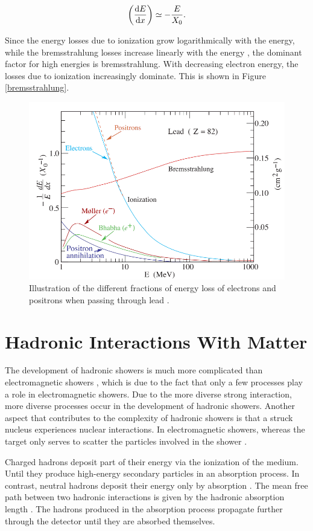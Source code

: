 \documentclass[12pt, a4paper]{thesis}
\begin{document}
\begin{align}
\left( \dv{E}{x} \right) \simeq - \frac{E}{X_0}.
\end{align}

Since the energy losses due to ionization grow logarithmically with
the energy, while the bremsstrahlung losses increase linearly with the
energy \cite{PhysRevD.98.030001}, the dominant factor for high
energies is bremsstrahlung. With decreasing electron energy, the
losses due to ionization increasingly dominate. This is shown in
Figure \ref{bremsstrahlung}.

\begin{figure}[htbp]
\centering
\includegraphics[width=0.8 \textwidth]{../images/bremsstrahlung.png}
\caption{\label{fig:org38d2e17}
Illustration of the different fractions of energy loss of electrons and positrons when passing through lead \cite{PhysRevD.98.030001}.}
\end{figure}

\section{Hadronic Interactions With Matter}
\label{sec:org39e1a53}

The development of hadronic showers is much more complicated than
electromagnetic showers \cite{wigman18}, which is due to the fact that
only a few processes play a role in electromagnetic showers.  Due to
the more diverse strong interaction, more diverse processes occur in
the development of hadronic showers. Another aspect that contributes
to the complexity of hadronic showers is that a struck nucleus
experiences nuclear interactions. In electromagnetic showers, whereas
the target only serves to scatter the particles involved in the shower
\cite{wigman18}.

Charged hadrons deposit part of their energy via the ionization of the
medium. Until they produce high-energy secondary particles in an absorption
process.  In contrast, neutral hadrons deposit their energy only by absorption
\cite{wigman18,fabjan03}. The mean free path between two hadronic interactions is
given by the hadronic absorption length \cite{fabjan03}. The hadrons produced in
the absorption process propagate further through the detector until they are
absorbed themselves.
\end{document}
